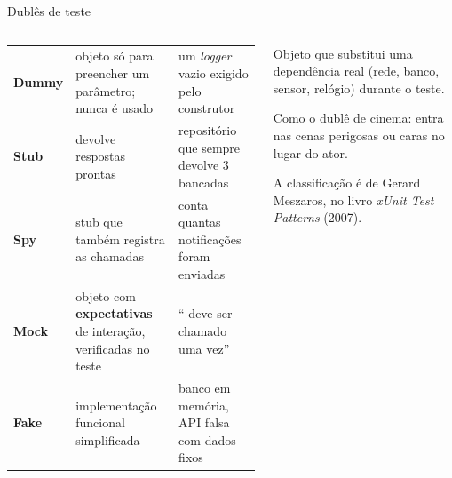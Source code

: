 \begin{frame}{Dublês de teste}
  \begin{columns}[T]
    \begin{column}{0.62\textwidth}
      \scriptsize
      \begin{tabularx}{\linewidth}{@{}l L L@{}}
        \toprule
         &  &  \\
        \midrule
        \textbf{Dummy} & objeto só para preencher um parâmetro; nunca é usado & um \emph{logger} vazio exigido pelo construtor \\
        \textbf{Stub} & devolve respostas prontas & repositório que sempre devolve 3 bancadas \\
        \textbf{Spy} & stub que também registra as chamadas & conta quantas notificações foram enviadas \\
        \textbf{Mock} & objeto com \textbf{expectativas} de interação, verificadas no teste & `` deve ser chamado uma vez'' \\
        \textbf{Fake} & implementação funcional simplificada & banco em memória, API falsa com dados fixos \\
        \bottomrule
      \end{tabularx}
    \end{column}
    \begin{column}{0.36\textwidth}
      \begin{definicao}
        Objeto que substitui uma dependência real (rede, banco, sensor, relógio) durante o teste.
      \end{definicao}
      \begin{analogia}
        Como o dublê de cinema: entra nas cenas perigosas ou caras no lugar do ator.
      \end{analogia}
      \begin{historia}
        A classificação é de Gerard Meszaros, no livro \emph{xUnit Test Patterns} (2007).
      \end{historia}
    \end{column}
  \end{columns}
\end{frame}

